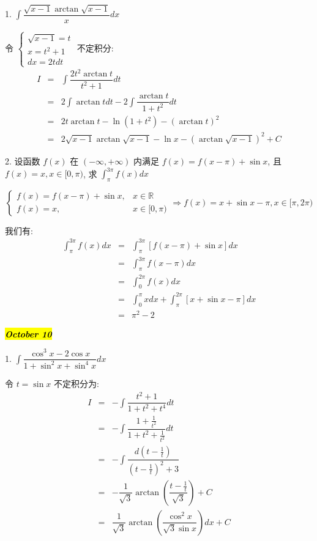 1. $\displaystyle{\int \dfrac{\sqrt{x-1}\arctan \sqrt{x-1}}{x}dx}$
\begin{solution}

	令 $
	\begin{cases}
		\sqrt{x-1} = t\\
		x = t^{2} + 1\\
		dx = 2tdt
	\end{cases}$ 不定积分:  
	\begin{eqnarray*}
		I & = & \int \dfrac{2t^2\arctan t}{t^2+1}dt\\
		  & = & 2\int \arctan tdt-2\int\dfrac{\arctan t}{1+t^2}dt\\
		  & = & 2t\arctan t-\ln(1+t^2)-(\arctan t)^2\\
		  & = & 2\sqrt{x-1}\arctan \sqrt{x-1}-\ln x-(\arctan\sqrt{x-1})^2+C
	\end{eqnarray*}
\end{solution}

2. 设函数 $f(x)$ 在 $(-\infty,+\infty)$ 内满足 $f(x)=f(x-\pi)+\sin x$, 且 $f(x)=x,x\in[0,\pi)$, 求 $\displaystyle{\int_{\pi}^{3\pi}f(x)dx}$
\begin{solution}

	$$\begin{cases}
		f(x) = f(x-\pi)+\sin x, & x\in \mathbb{R}\\
		f(x) = x, &x\in[0,\pi)
	\end{cases}  
	\Rightarrow
	f(x) = x+\sin x-\pi,x\in[\pi,2\pi)$$
	
	我们有:  
	\begin{eqnarray*}
		\int_{\pi}^{3\pi}f(x)dx & = & \int_{\pi}^{3\pi}[f(x-\pi)+\sin x]dx\\
								& = & \int_{\pi}^{3\pi}f(x-\pi)dx\\
								& = & \int_{0}^{2\pi}f(x)dx\\
								& = & \int_{0}^{\pi}xdx+\int_{\pi}^{2\pi}[x+\sin x-\pi]dx\\
								& = & \pi^2-2
	\end{eqnarray*}
\end{solution}

\hl{\textbf{\textit{October 10}}}

1. $\displaystyle{\int \dfrac{\cos^3 x-2\cos x}{1+\sin^2 x+\sin^4 x}dx}$
\begin{solution}

	令 $t=\sin x$ 不定积分为:  
	\begin{eqnarray*}
		I & = & -\int \dfrac{t^2+1}{1+t^2+t^4}dt\\
		  & = & -\int \dfrac{1+\frac{1}{t^2}}{1+t^2+\frac{1}{t^2}}dt\\
		  & = & -\int \dfrac{d(t-\frac{1}{t})}{(t-\frac{1}{t})^2+3}\\
		  & = & -\dfrac{1}{\sqrt{3}}\arctan(\dfrac{t-\frac{1}{t}}{\sqrt{3}})+C\\
		  & = & \dfrac{1}{\sqrt{3}}\arctan(\dfrac{\cos^2 x}{\sqrt{3}\sin x})dx+C
	\end{eqnarray*}
\end{solution}

